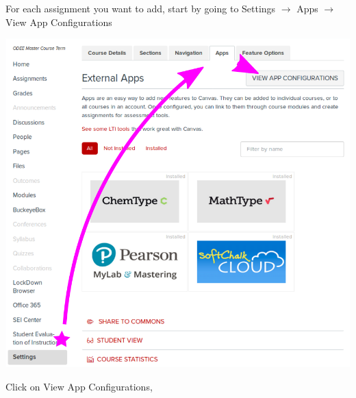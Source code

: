 \documentclass{ximera}
\begin{document}
For each assignment you want to add, start by going to Settings $\to$  Apps $\to$ View App Configurations

\begin{image}
\includegraphics{canvas1.png}
\end{image}
Click on View App Configurations, 
\end{document}
